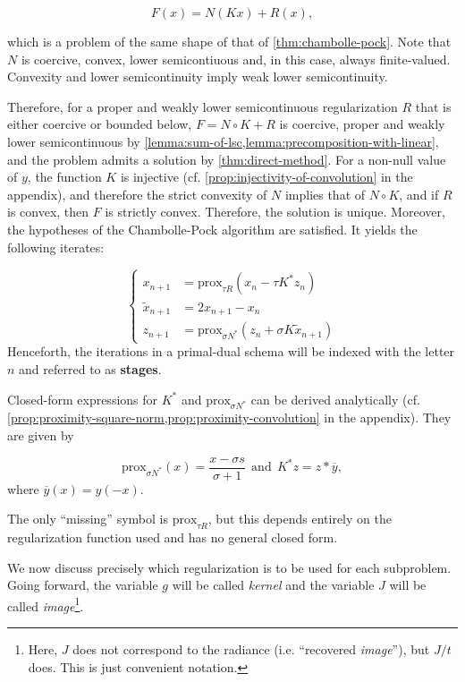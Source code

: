 \documentclass[twocolumn,twoside,a4paper,10pt]{IEEEtran}
\begin{document}
\[
  F(x) = N(Kx) + R(x),
\]

which is a problem of the same shape of that of \cref{thm:chambolle-pock}. Note that \(N\) is coercive, convex, lower semicontiuous and, in this case, always finite-valued. Convexity and lower semicontinuity imply weak lower semicontinuity.

Therefore, for a proper and weakly lower semicontinuous regularization \(R\) that is either coercive or bounded below, 
\(F=N\circ K + R\) is coercive, proper and weakly lower semicontinuous by \cref{lemma:sum-of-lsc,lemma:precomposition-with-linear}, and the problem admits a solution by \cref{thm:direct-method}. For a non-null value of \(y\), the function \(K\) is injective (cf. \cref{prop:injectivity-of-convolution} in the appendix), and therefore the strict convexity of \(N\) implies that of \(N\circ K\), and if \(R\) is convex, then \(F\) is strictly convex. Therefore, the solution is unique. Moreover, the hypotheses of the Chambolle-Pock algorithm are satisfied. It yields the following iterates:

\begin{equation}\label{eq:iterates}
  \left\{
  \begin{split}
    x_{n+1} & = \text{prox}_{\tau R}(x_n - \tau K^*z_n) \\
    \tilde{x}_{n+1} & = 2x_{n+1} - x_n \\
    z_{n+1} & = \text{prox}_{\sigma N^*}(z_n + \sigma K\tilde{x}_{n+1})
  \end{split}
  \right.
\end{equation}
Henceforth, the iterations in a primal-dual schema will be indexed with the letter \(n\) and referred to as \textbf{stages}.

Closed-form expressions for \(K^*\) and \(\text{prox}_{\sigma N^*}\) can be derived analytically (cf. \cref{prop:proximity-square-norm,prop:proximity-convolution} in the appendix). They are given by

\begin{equation}\label{eq:primal-dual-analytical}
  \text{prox}_{\sigma N^*}(x) = \frac{x-\sigma s}{\sigma + 1} ~~ \text{and} ~~ K^*z = z\ast \overline{y},
\end{equation}
where \(\overline{y}(x) = y(-x)\).

The only ``missing'' symbol is \(\text{prox}_{\tau R}\), but this depends entirely on the regularization function used and has no general closed form.

We now discuss precisely which regularization is to be used for each subproblem. Going forward, the variable \(g\) will be called \textit{kernel} and the variable \(J\) will be called \textit{image}\footnote{Here, \(J\) does not correspond to the radiance (i.e. ``recovered \textit{image}''), but \(J/t\) does. This is just convenient notation.}.
\end{document}
